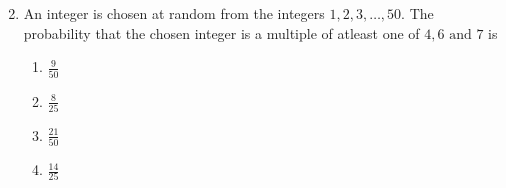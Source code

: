 \documentclass[journal]{IEEEtran}
\begin{document}
\begin{enumerate}
\begin{multicols}{2}
\begin{enumerate}
		\end{enumerate}
	\end{multicols}
\item An integer is chosen at random from the integers $ 1 , 2 , 3 ,\dots , 50$. The probability that the chosen integer is a multiple of atleast one of $ 4 , 6 \text{ and } 7$ is 
	\begin{enumerate}
		\item $\frac{9}{50}$\\
		\item $\frac{8}{25}$\\
		\item $\frac{21}{50}$\\
		\item $\frac{14}{25}$
	\end{enumerate}
\end{enumerate}
 
\end{document}
